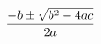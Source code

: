 \documentclass[preview]{standalone}
\begin{document}
\begin{align*}
\special{dvisvgm:raw <g id='unique000'>}\frac{-b \pm \sqrt{b^2 - 4ac}}{2a}\special{dvisvgm:raw </g>}
\end{align*}
\end{document}
